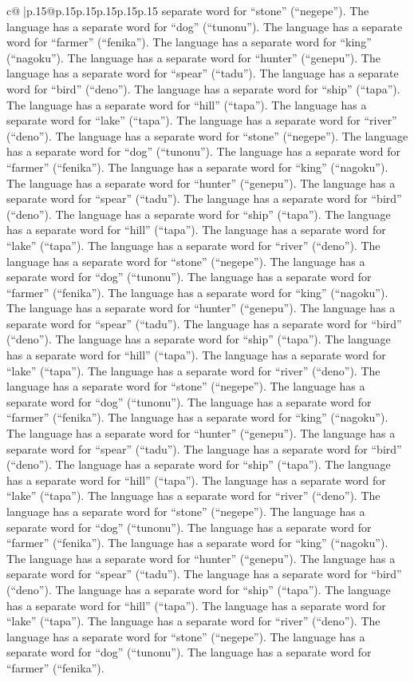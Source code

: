 \documentclass{article}
\begin{document}
{\begin{supertabular}{c@{$\;$}|p{.15\linewidth}@{}p{.15\linewidth}p{.15\linewidth}p{.15\linewidth}p{.15\linewidth}p{.15\linewidth}}
{{{separate word for “stone” (“negepe”). The language has a separate word for “dog” (“tunonu”). The language has a separate word for “farmer” (“fenika”). The language has a separate word for “king” (“nagoku”). The language has a separate word for “hunter” (“genepu”). The language has a separate word for “spear” (“tadu”). The language has a separate word for “bird” (“deno”). The language has a separate word for “ship” (“tapa”). The language has a separate word for “hill” (“tapa”). The language has a separate word for “lake” (“tapa”). The language has a separate word for “river” (“deno”). The language has a separate word for “stone” (“negepe”). The language has a separate word for “dog” (“tunonu”). The language has a separate word for “farmer” (“fenika”). The language has a separate word for “king” (“nagoku”). The language has a separate word for “hunter” (“genepu”). The language has a separate word for “spear” (“tadu”). The language has a separate word for “bird” (“deno”). The language has a separate word for “ship” (“tapa”). The language has a separate word for “hill” (“tapa”). The language has a separate word for “lake” (“tapa”). The language has a separate word for “river” (“deno”). The language has a separate word for “stone” (“negepe”). The language has a separate word for “dog” (“tunonu”). The language has a separate word for “farmer” (“fenika”). The language has a separate word for “king” (“nagoku”). The language has a separate word for “hunter” (“genepu”). The language has a separate word for “spear” (“tadu”). The language has a separate word for “bird” (“deno”). The language has a separate word for “ship” (“tapa”). The language has a separate word for “hill” (“tapa”). The language has a separate word for “lake” (“tapa”). The language has a separate word for “river” (“deno”). The language has a separate word for “stone” (“negepe”). The language has a separate word for “dog” (“tunonu”). The language has a separate word for “farmer” (“fenika”). The language has a separate word for “king” (“nagoku”). The language has a separate word for “hunter” (“genepu”). The language has a separate word for “spear” (“tadu”). The language has a separate word for “bird” (“deno”). The language has a separate word for “ship” (“tapa”). The language has a separate word for “hill” (“tapa”). The language has a separate word for “lake” (“tapa”). The language has a separate word for “river” (“deno”). The language has a separate word for “stone” (“negepe”). The language has a separate word for “dog” (“tunonu”). The language has a separate word for “farmer” (“fenika”). The language has a separate word for “king” (“nagoku”). The language has a separate word for “hunter” (“genepu”). The language has a separate word for “spear” (“tadu”). The language has a separate word for “bird” (“deno”). The language has a separate word for “ship” (“tapa”). The language has a separate word for “hill” (“tapa”). The language has a separate word for “lake” (“tapa”). The language has a separate word for “river” (“deno”). The language has a separate word for “stone” (“negepe”). The language has a separate word for “dog” (“tunonu”). The language has a separate word for “farmer” (“fenika”). }}}
\end{supertabular}}
\end{document}
